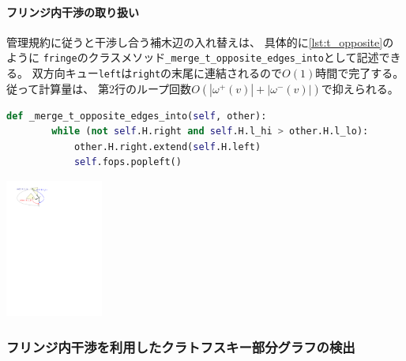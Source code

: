 \paragraph{フリンジ内干渉の取り扱い}
管理規約に従うと干渉し合う補木辺の入れ替えは、
具体的に\lstrefname\ref{lst:t_opposite}のように
{\tt fringe}のクラスメソッド{\tt \_merge\_t\_opposite\_edges\_into}として記述できる。
双方向キュー{\tt left}は{\tt right}の末尾に連結されるので$O(1)$時間で完了する。
従って計算量は、
第2行のループ回数$O(|\omega^+(v)| + |\omega^-(v)|)$で抑えられる。


\begin{paracol}{2}
\begin{lstlisting}[language=Python, caption=\_merge\_t\_opposite\_edges\_into,
                   label=lst:t_opposite]
    def _merge_t_opposite_edges_into(self, other):
        while (not self.H.right and self.H.l_hi > other.H.l_lo):
            other.H.right.extend(self.H.left)
            self.fops.popleft()
\end{lstlisting}

\switchcolumn
\vspace{0.5\intextsep}
\centering
\includegraphics[width=0.24\textwidth]{figures/t_opposite.pdf}
\end{paracol}












\subsubsection{フリンジ内干渉を利用したクラトフスキー部分グラフの検出}


